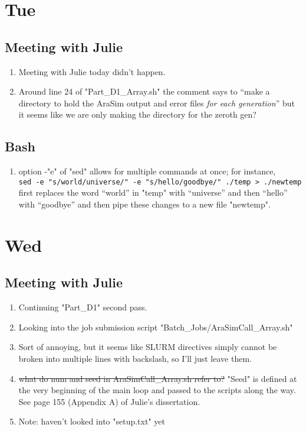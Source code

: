 \documentclass[12pt,letterpaper]{article}
\begin{document}
\section{Tue}
\subsection{Meeting with Julie}
\begin{enumerate}
  \item Meeting with Julie today didn't happen.
  \item Around line 24 of "Part_D1_Array.sh" the comment says to ``make a directory
    to hold the AraSim output and error files  \textit{for each generation}'' but it
    seems like we are only making the directory for the zeroth gen?
\end{enumerate}
\subsection{Bash}
\begin{enumerate}
  \item option -"e" of "sed" allows for multiple commands at once; for instance,\\
    \verb|sed -e "s/world/universe/" -e "s/hello/goodbye/" ./temp > ./newtemp|\\
    first replaces the word ``world'' in "temp" with ``universe'' and then ``hello''
    with ``goodbye'' and then pipe these changes to a new file "newtemp".
\end{enumerate}

\section{Wed}
\subsection{Meeting with Julie}
\begin{enumerate}
  \item Continuing "Part_D1" second pass. 
  \item Looking into the job submission script "Batch_Jobs/AraSimCall_Array.sh"
  \item Sort of annoying, but it seems like SLURM directives simply cannot be broken 
    into multiple lines with backslash, so I'll just leave them.
  \item \st{what do num and seed in AraSimCall\_Array.sh refer to?} "Seed" is
    defined at the very beginning of the main loop and passed to the scripts
    along the way. See page 155 (Appendix A) of Julie's dissertation.
  \item Note: haven't looked into "setup.txt" yet
\end{enumerate}
\end{document}
